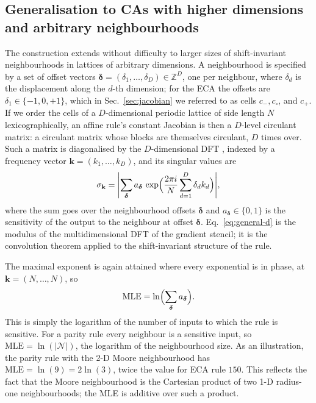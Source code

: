 \documentclass[a4paper,fleqn]{cas-dc}
\begin{document}
\subsection{Generalisation to CAs with higher dimensions and arbitrary neighbourhoods}

The construction extends without difficulty to larger sizes of shift-invariant neighbourhoods in lattices of arbitrary dimensions. A neighbourhood is specified by a set of offset vectors $\boldsymbol{\delta}=(\delta_1,\dots,\delta_D)\in\mathbb{Z}^D$, one per neighbour, where $\delta_d$ is the displacement along the $d$-th dimension; for the ECA the offsets are $\delta_1 \in \{-1, 0, +1\}$, which in Sec.~\ref{sec:jacobian} we referred to as cells $c_-, c_\circ$, and $c_+$. If we order the cells of a $D$-dimensional periodic lattice of side length $N$ lexicographically, an affine rule's constant Jacobian is then a $D$-level circulant matrix: a circulant matrix whose blocks are themselves circulant, $D$ times over. Such a matrix is diagonalised by the $D$-dimensional DFT \cite{davis1979circulant}, indexed by a frequency vector $\mathbf{k}=(k_1,\dots,k_D)$, and its singular values are
\begin{equation}
    \label{eq:general-d}
    \sigma_{\mathbf{k}}
    =\Biggl\lvert\sum_{\boldsymbol{\delta}}a_{\boldsymbol{\delta}}\,
    \exp\Bigl(\frac{2\pi i}{N}\sum_{d=1}^{D}\delta_d k_d\Bigr)\Biggr\rvert,
\end{equation}
where the sum goes over the neighbourhood offsets $\boldsymbol{\delta}$ and $a_{\boldsymbol{\delta}} \in \{0,1\}$ is the sensitivity of the output to the neighbour at offset $\boldsymbol{\delta}$. Eq.~\eqref{eq:general-d} is the modulus of the multidimensional DFT of the gradient stencil; it is the
convolution theorem applied to the shift-invariant structure of the rule.

The maximal exponent is again attained where every exponential is in phase, at
$\mathbf{k}=(N,\dots,N)$, so
\begin{equation}
    \label{eq:mle-count}
    \mathrm{MLE}=\ln\Bigl(\sum_{\boldsymbol{\delta}}
    a_{\boldsymbol{\delta}}\Bigr).
\end{equation}
This is simply the logarithm of the number of inputs to which the rule is sensitive. For a parity rule every neighbour is a sensitive input, so $\mathrm{MLE}=\ln(\lvert\mathcal{N}\rvert)$, the logarithm of the neighbourhood size. As an illustration, the parity rule with the 2-D Moore neighbourhood has $\mathrm{MLE}=\ln(9)=2\ln(3)$, twice the value for ECA rule $150$. This reflects the fact that the Moore neighbourhood is the Cartesian product of two 1-D radius-one neighbourhoods; the MLE is additive over such a product.
\end{document}
